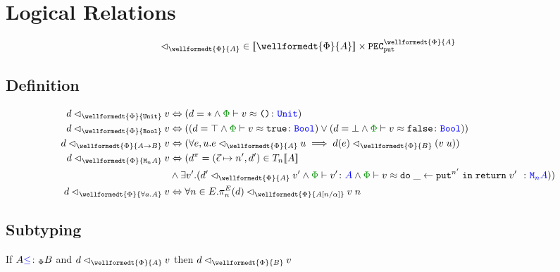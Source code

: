 \documentclass{Report}
\newcommand{\pecputA}[0]{\texttt{PEC}_\put^{\wellformedt{\P}{A}}}
\newcommand\eLogRel[4]{\logRel{#2}{\wellformedt{#1}{#3}}{#4}}
\newcommand\peLogRel[3]{\eLogRel{\P}{#1}{#2}{#3}}
\newcommand{\zptyperelation}[2]{\typerelation{\P}{#1}{#2}}
\newcommand{\zpberelation}[2]{\berelation{\P}{#1}{#2}}
\newcommand{\fapply}[0]{^E}
\newcommand\liftp[0]{^\pi}
\begin{document}
\section{Logical Relations}

\begin{equation}
    \label{LogicalRelationType}
    \relates_{\wellformedt{\P}{A}} \in \deno{\wellformedt{\P}{A}} \times \pecputA    
\end{equation}

\subsection{Definition}
\begin{definition}

    \begin{align*}
        \label{LogicalRelationDefinition}
        \peLogRel{d}{\U}{v} & \Leftrightarrow (d=\singleton \wedge \zpberelation{v}{\u}{\U})\\
        \peLogRel{d}{\B}{v} & \Leftrightarrow ((d=\top \wedge \zpberelation{v}{\t}{\B}) \vee (d=\bot \wedge \zpberelation{v}{\f}{\B}))\\
        \peLogRel{d}{\ab}{v} & \Leftrightarrow (\forall e, u. \peLogRel{e}{A}{u}\implies \peLogRel{d(e)}{B}{(\apply{v}{u})})\\
        \peLogRel{d}{\mna}{v}&\Leftrightarrow  (d\liftp = (\ev\mapsto n', d')\in \T{n}{\deno{A}}
        \\ & \wedge \exists v'. (\peLogRel{d'}{A}{v'} \wedge \zptyperelation{v'}{A}\wedge \zpberelation{v}{\doin{\_}{\put^{n'}}{\return{v'}}}{\mna}))
        \\
        \peLogRel{d}{\all{a}{A}}{v} & \Leftrightarrow \forall{n}\in E. \peLogRel{\pi_n\fapply(d)}{A\ssub{\a}{n}}{\eapp{v}{n}}
    \end{align*}
\end{definition}
\subsection{Subtyping}

\begin{theorem}
    If $A{\color{blue} \leq\colon}_\Phi B$ and $\peLogRel{d}{A}{v}$ then $\peLogRel{d}{B}{v}$
\end{theorem}
\end{document}
